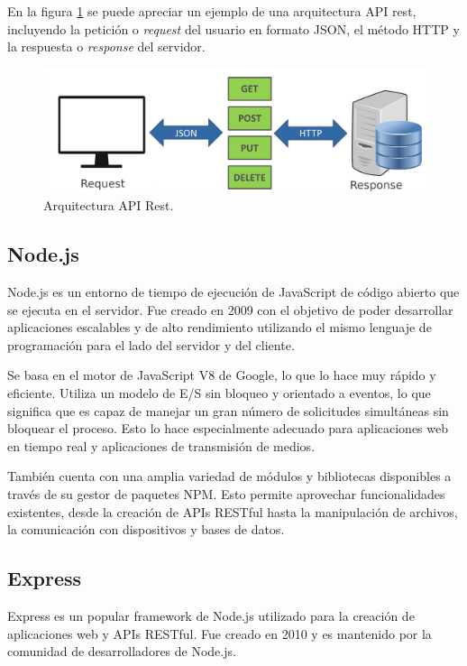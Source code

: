 En la figura \ref{fig:apirest} se puede apreciar un ejemplo de una arquitectura API rest, incluyendo la petición o \textit{request} del usuario en formato JSON, el método HTTP y la respuesta o \textit{response} del servidor.

\begin{figure}[ht]
	\centering
	\includegraphics[scale=.15]{./Figures/apirest.png}
	\caption{Arquitectura API Rest.}
	\label{fig:apirest}
\end{figure}

\subsection{Node.js}
\label{subsec:nodejs}

Node.js es un entorno de tiempo de ejecución de JavaScript de código abierto que se ejecuta en el servidor. Fue creado en 2009 con el objetivo de poder desarrollar aplicaciones escalables y de alto rendimiento utilizando el mismo lenguaje de programación para el lado del servidor y del cliente.

Se basa en el motor de JavaScript V8 de Google, lo que lo hace muy rápido y eficiente. Utiliza un modelo de E/S sin bloqueo y orientado a eventos, lo que significa que es capaz de manejar un gran número de solicitudes simultáneas sin bloquear el proceso. Esto lo hace especialmente adecuado para aplicaciones web en tiempo real y aplicaciones de transmisión de medios.

También cuenta con una amplia variedad de módulos y bibliotecas disponibles a través de su gestor de paquetes NPM. Esto permite aprovechar funcionalidades existentes, desde la creación de APIs RESTful hasta la manipulación de archivos, la comunicación con dispositivos y bases de datos.

\subsection{Express}
\label{subsec:express}

Express es un popular framework de Node.js utilizado para la creación de aplicaciones web y APIs RESTful. Fue creado en 2010 y es mantenido por la comunidad de desarrolladores de Node.js.

